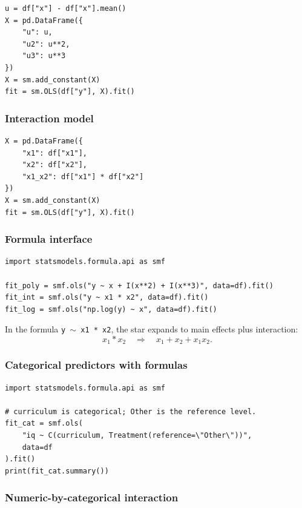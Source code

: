 \begin{verbatim}
u = df["x"] - df["x"].mean()
X = pd.DataFrame({
    "u": u,
    "u2": u**2,
    "u3": u**3
})
X = sm.add_constant(X)
fit = sm.OLS(df["y"], X).fit()
\end{verbatim}

\subsubsection*{Interaction model}

\begin{verbatim}
X = pd.DataFrame({
    "x1": df["x1"],
    "x2": df["x2"],
    "x1_x2": df["x1"] * df["x2"]
})
X = sm.add_constant(X)
fit = sm.OLS(df["y"], X).fit()
\end{verbatim}

\subsubsection*{Formula interface}

\begin{verbatim}
import statsmodels.formula.api as smf

fit_poly = smf.ols("y ~ x + I(x**2) + I(x**3)", data=df).fit()
fit_int = smf.ols("y ~ x1 * x2", data=df).fit()
fit_log = smf.ols("np.log(y) ~ x", data=df).fit()
\end{verbatim}

In the formula \texttt{y \(\sim\) x1 * x2}, the star expands to main effects plus interaction:
\begin{equation}
  x_1*x_2 \quad\Longrightarrow\quad x_1+x_2+x_1x_2.
\end{equation}

\subsubsection*{Categorical predictors with formulas}

\begin{verbatim}
import statsmodels.formula.api as smf

# curriculum is categorical; Other is the reference level.
fit_cat = smf.ols(
    "iq ~ C(curriculum, Treatment(reference=\"Other\"))",
    data=df
).fit()
print(fit_cat.summary())
\end{verbatim}

\subsubsection*{Numeric-by-categorical interaction}

